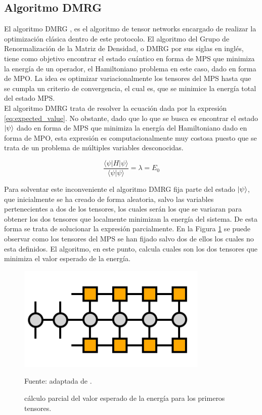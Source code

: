 \subsection{Algoritmo DMRG}
\label{sub_sec:dmrg}

El algoritmo DMRG \citep{schollwöck}, es el algoritmo de tensor  networks encargado de realizar la optimización clásica dentro de este protocolo. El algoritmo del Grupo de Renormalización de la Matriz de Densidad, o DMRG por sus siglas en inglés, tiene como objetivo encontrar el estado cuántico en forma de MPS que minimiza la energía de un operador, el Hamiltoniano problema en este caso, dado en forma de MPO. La idea es optimizar variacionalmente los tensores del MPS hasta que se cumpla un criterio de convergencia, el cual es, que se minimice la energía total del estado MPS. \\

El algoritmo DMRG trata de resolver la ecuación dada por la expresión \ref{eq:expected_value}. No obstante, dado que lo que se busca es encontrar el estado $\ket{\psi}$ dado en forma de MPS que minimiza la energía del Hamiltoniano dado en forma de MPO, esta expresión es computacionalmente muy costosa puesto que se trata de un problema de múltiples variables desconocidas. 


\begin{equation}
    \frac{\langle \psi | H | \psi \rangle}{\langle \psi | \psi \rangle} = \lambda = E_0
    \label{eq:expected_value}
\end{equation}

Para solventar este inconveniente el algoritmo DMRG fija parte del estado $\ket{\psi}$, que inicialmente se ha creado de forma aleatoria, salvo las variables pertenecientes a dos de los tensores, los cuales serán los que se variaran para obtener los dos tensores que localmente minimizan la energía del sistema. De esta forma se trata de solucionar la expresión parcialmente. En la Figura \ref{fig:mpo_mps} se puede observar como los tensores del MPS se han fijado salvo dos de ellos los cuales no esta definidos. El algoritmo, en este punto, calcula cuales son los dos tensores que minimiza el valor esperado de la energía.

\begin{figure}[!h]
    \centering
    \includegraphics[scale = 0.7]{img/05-dmrg_mpo_mps.png}
    \caption{cálculo parcial del valor esperado de la energía para los primeros tensores.}
    Fuente: adaptada de \cite{tn}.
    \label{fig:mpo_mps}
\end{figure}


